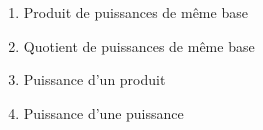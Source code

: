 %
%
  \begin{enumerate}[cols=2]
    \item Produit de puissances de même base
    \item Quotient de puissances de même base
    \item Puissance d'un produit
    \item Puissance d'une puissance
  \end{enumerate}
